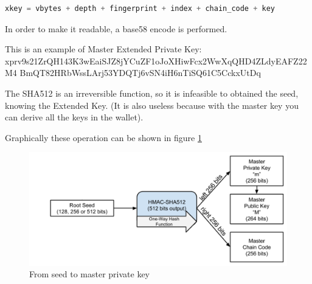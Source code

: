 \begin{lstlisting}[language=Python]
xkey = vbytes + depth + fingerprint + index + chain_code + key
\end{lstlisting}
\begin{flushleft}
	In order to make it readable, a base58 encode is performed.
\end{flushleft}
This is an example of Master Extended Private Key: \\
xprv9s21ZrQH143K3wEaiSJZ8jYCuZF1oJoXHiwFcx2WwXqQHD4ZLdyEAFZ22M4 BmQT82HRbWssLArj53YDQTj6vSN4iH6nTiSQ61C5CckxUtDq

\begin{remark}
	The SHA512 is an irreversible function, so it is infeasible to obtained the seed, knowing the Extended Key. (It is also useless because with the master key you can derive all the keys in the wallet).
\end{remark}

\begin{flushleft}
	Graphically these operation can be shown in figure \ref{fig:From seed to master private key}
\end{flushleft}

\begin{figure}[ht!]
	\centering
	\includegraphics[width=13cm]{Figures/seed_to_xprv.png}
	\caption{From seed to master private key}
	\label{fig:From seed to master private key}
\end{figure}


